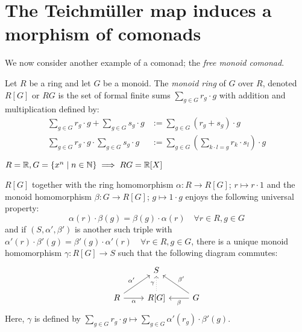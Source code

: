 \section{The Teichmüller map induces a morphism of comonads}
We now consider another example of a comonad; the \textit{free monoid comonad}.
\begin{definition}
    Let $R$ be a ring and let $G$ be a monoid.
    The \textit{monoid ring} of $G$ over $R$, denoted $R[G]$ or $RG$
    is the set of formal finite sums $\sum_{g \in G}r_g \cdot g$
    with addition and multiplication defined by:
    \begin{align*}
        \sum_{g \in G}r_g \cdot g + \sum_{g \in G}s_g \cdot g
        & := \sum_{g \in G}(r_g + s_g)\cdot g \\
        \sum_{g \in G}r_g \cdot g \cdot \sum_{g \in G}s_g \cdot g
        & := \sum_{g \in G}(\sum_{k \cdot l = g} r_k \cdot s_l)\cdot g 
    \end{align*}
\end{definition}
\begin{example}
    $R = \mathbb{R}, G = \{x^n \mid n \in \mathbb{N}\} \implies RG = \mathbb{R}[X]$
\end{example}
\begin{remark} \label{rem: universal property of monoid ring}
$R[G]$ together with the ring homomorphism $\alpha \colon R \to R[G]$;
$r \mapsto r \cdot 1$ and the monoid homomorphism $\beta \colon 
G \to R[G]$; $g \mapsto 1 \cdot g$ 
enjoys the following universal property:
\[
  \alpha(r) \cdot \beta(g) = \beta(g) \cdot \alpha(r)
   \quad \forall r \in R, g \in G
\]
and if $(S,\alpha',\beta')$ is another such triple with
$\alpha'(r) \cdot \beta'(g) = \beta'(g) \cdot \alpha'(r)
   \quad \forall r \in R, g \in G$,
there is a unique monoid homomorphism $\gamma \colon R[G] \to S$
such that the following diagram commutes:
\[
    \begin{tikzcd}
        & S \\
        R \arrow[r,"\alpha"'] \arrow[ur,"\alpha'"] 
        & R[G] \arrow[u,"\gamma",dotted] 
        & G \arrow[l,"\beta"] \arrow[ul,"\beta'"']
    \end{tikzcd}
\]
Here, $\gamma$ is defined by 
$\sum_{g \in G}r_g \cdot g \mapsto \sum_{g \in G}\alpha'(r_g) \cdot \beta'(g)$.
\end{remark}
